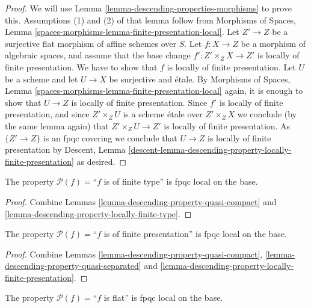 \begin{proof}
We will use
Lemma \ref{lemma-descending-properties-morphisms}
to prove this. Assumptions (1) and (2) of that lemma follow from
Morphisms of Spaces,
Lemma \ref{spaces-morphisms-lemma-finite-presentation-local}.
Let $Z' \to Z$ be a surjective flat morphism of affine schemes over $S$.
Let $f : X \to Z$ be a morphism of algebraic spaces, and assume
that the base change $f' : Z' \times_Z X \to Z'$ is locally of
finite presentation.
We have to show that $f$ is locally of finite presentation. Let $U$ be a scheme
and let $U \to X$ be surjective and \'etale. By
Morphisms of Spaces,
Lemma \ref{spaces-morphisms-lemma-finite-presentation-local}
again, it is enough to show that $U \to Z$ is locally of finite presentation.
Since $f'$ is locally of finite presentation, and since $Z' \times_Z U$ is a
scheme \'etale over $Z' \times_Z X$ we conclude (by the same lemma again) that
$Z' \times_Z U \to Z'$ is locally of finite presentation.
As $\{Z' \to Z\}$ is an fpqc covering we conclude that
$U \to Z$ is locally of finite presentation by
Descent,
Lemma \ref{descent-lemma-descending-property-locally-finite-presentation}
as desired.
\end{proof}

\begin{lemma}
\label{lemma-descending-property-finite-type}
The property $\mathcal{P}(f) =$``$f$ is of finite type''
is fpqc local on the base.
\end{lemma}

\begin{proof}
Combine Lemmas \ref{lemma-descending-property-quasi-compact}
and \ref{lemma-descending-property-locally-finite-type}.
\end{proof}

\begin{lemma}
\label{lemma-descending-property-finite-presentation}
The property $\mathcal{P}(f) =$``$f$ is of finite presentation''
is fpqc local on the base.
\end{lemma}

\begin{proof}
Combine Lemmas \ref{lemma-descending-property-quasi-compact},
\ref{lemma-descending-property-quasi-separated} and
\ref{lemma-descending-property-locally-finite-presentation}.
\end{proof}

\begin{lemma}
\label{lemma-descending-property-flat}
The property $\mathcal{P}(f) =$``$f$ is flat''
is fpqc local on the base.
\end{lemma}

